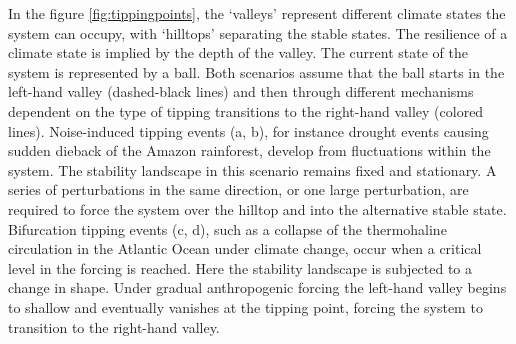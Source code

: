 In the figure \ref{fig:tippingpoints}, the ‘valleys’ represent different climate states the system can occupy, with ‘hilltops’ separating the stable states. The resilience of a climate state is implied by the depth of the valley. The current state of the system is represented by a ball. Both scenarios assume that the ball starts in the left-hand valley (dashed-black lines) and then through different mechanisms dependent on the type of tipping transitions to the right-hand valley (colored lines). Noise-induced tipping events (a, b), for instance drought events causing sudden dieback of the Amazon rainforest, develop from fluctuations within the system. The stability landscape in this scenario remains fixed and stationary. A series of perturbations in the same direction, or one large perturbation, are required to force the system over the hilltop and into the alternative stable state. Bifurcation tipping events (c, d), such as a collapse of the thermohaline circulation in the Atlantic Ocean under climate change, occur when a critical level in the forcing is reached. Here the stability landscape is subjected to a change in shape. Under gradual anthropogenic forcing the left-hand valley begins to shallow and eventually vanishes at the tipping point, forcing the system to transition to the right-hand valley. \\






